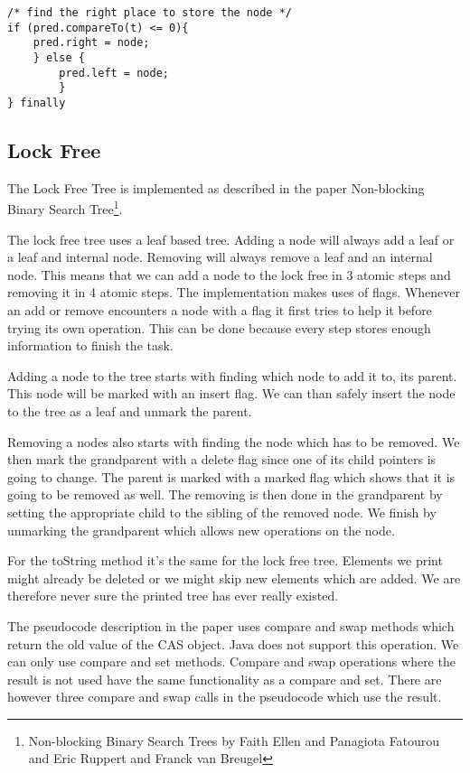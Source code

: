 \documentclass[10pt,a4paper]{article}
\begin{document}
\begin{lstlisting}
/* find the right place to store the node */
if (pred.compareTo(t) <= 0){
	pred.right = node;
	} else {	
		pred.left = node;
		}
} finally
\end{lstlisting}



\subsection{Lock Free}
The Lock Free Tree is implemented as described in the paper Non-blocking Binary Search Tree\footnote{Non-blocking Binary Search Trees by Faith Ellen and Panagiota Fatourou and Eric Ruppert and Franck van Breugel}. 

The lock free tree uses a leaf based tree. Adding a node will always add a leaf or a leaf and internal node. Removing will always remove a leaf and an internal node. This means that we can add a node to the lock free in 3 atomic steps and removing it in 4 atomic steps. The implementation makes uses of flags. Whenever an add or remove encounters a node with a flag it first tries to help it before trying its own operation. This can be done because every step stores enough information to finish the task.

Adding a node to the tree starts with finding which node to add it to, its parent. This node will be marked with an insert flag. We can than safely insert the node to the tree as a leaf and unmark the parent. 

Removing a nodes also starts with finding the node which has to be removed. We then mark the grandparent with a delete flag since one of its child pointers is going to change. The parent is marked with a marked flag which shows that it is going to be removed as well. The removing is then done in the grandparent by setting the appropriate child to the sibling of the removed node. We finish by unmarking the grandparent which allows new operations on the node.

For the toString method it's the same for the lock free tree. Elements we print might already be deleted or we might skip new elements which are added. We are therefore never sure the printed tree has ever really existed.

The pseudocode description in the paper uses compare and swap methods which return the old value of the CAS object. Java does not support this operation. We can only use compare and set methods. Compare and swap operations where the result is not used have the same functionality as a compare and set. There are however three compare and swap calls in the pseudocode which use the result.
\end{document}
